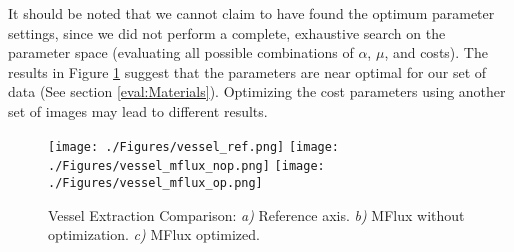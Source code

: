 It should be noted that we cannot claim to have found the optimum parameter settings, since we did not perform a complete, exhaustive search on the parameter space (evaluating all possible combinations of $\alpha$, $\mu$, and costs). The results in Figure \ref{fig:ves_op} suggest that the parameters are near optimal for our set of data (See section \ref{eval:Materials}). Optimizing the cost parameters using another set of images may lead to different results.

\begin{figure}[ht]
	\centering
		\texttt{[image: ./Figures/vessel\_ref.png]}
		\texttt{[image: ./Figures/vessel\_mflux\_nop.png]}
		\texttt{[image: ./Figures/vessel\_mflux\_op.png]}
	\caption[Centerline Optimization]{Vessel Extraction Comparison: \textit{a)} Reference axis. \textit{b)} MFlux without optimization. \textit{c)} MFlux optimized.}
	\label{fig:ves_op}
\end{figure}